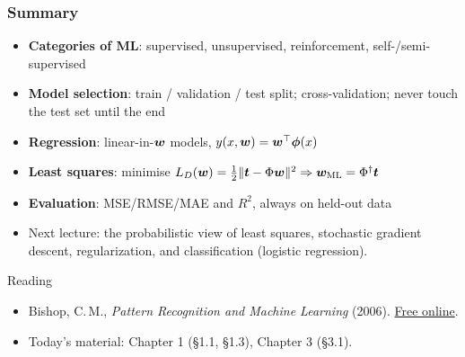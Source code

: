\documentclass[10pt]{beamer}
\begin{document}
\begin{frame}[fragile]
\frametitle{Summary}

\vfill
\begin{itemize}
\item \textbf{Categories of ML}: supervised, unsupervised, reinforcement,
  self-/semi-supervised
\vspace{6pt}
\item \textbf{Model selection}: train / validation / test split;
  cross-validation; never touch the test set until the end
\vspace{6pt}
\item \textbf{Regression}: linear-in-$\boldsymbol{w}$ models,
  $y(x,\boldsymbol{w}) = \boldsymbol{w}^\top\boldsymbol\phi(x)$
\vspace{6pt}
\item \textbf{Least squares}: minimise
  $L_D(\boldsymbol{w}) = \frac12\|\boldsymbol{t}-\Phi\boldsymbol{w}\|^2 \Rightarrow
  \boldsymbol{w}_{\mathrm{ML}} = \Phi^\dagger \boldsymbol{t}$
\vspace{6pt}
\item \textbf{Evaluation}: MSE/RMSE/MAE and $R^2$, always on held-out
  data
\vspace{6pt}
\item[$\Rightarrow$] Next lecture: the probabilistic view of least
  squares, stochastic gradient descent, regularization, and
  classification (logistic regression).
\end{itemize}
\vfill

\end{frame}
\begin{titledslide}{Reading}

  \begin{itemize}
  \item Bishop, C.\,M., \emph{Pattern Recognition and Machine Learning}
    (2006).
    \href{https://www.microsoft.com/en-us/research/uploads/prod/2006/01/Bishop-Pattern-Recognition-and-Machine-Learning-2006.pdf}{Free
      online}.
  \item Today's material: Chapter 1 (\S1.1, \S1.3), Chapter 3 (\S3.1).
  \end{itemize}

\end{titledslide}
\end{document}
